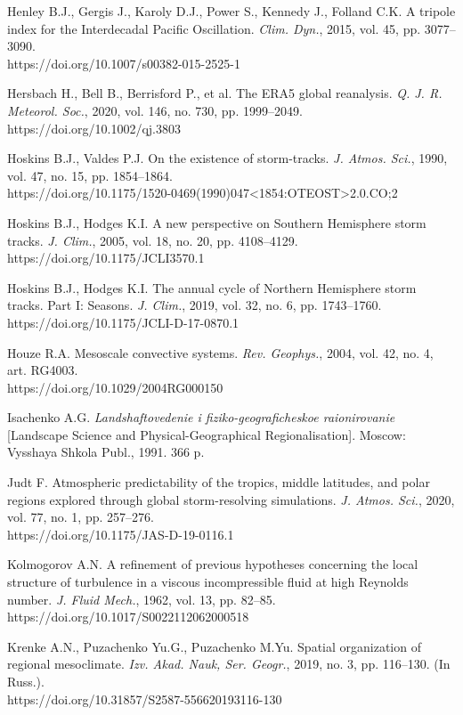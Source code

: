 \documentclass[12pt,a4paper]{article}
\begin{document}
\noindent Henley B.J., Gergis J., Karoly D.J., Power S., Kennedy J., Folland C.K. A tripole index for the Interdecadal Pacific Oscillation. \textit{Clim. Dyn.}, 2015, vol. 45, pp. 3077–3090.\\ https://doi.org/10.1007/s00382-015-2525-1

\noindent Hersbach H., Bell B., Berrisford P., et al. The ERA5 global reanalysis. \textit{Q. J. R. Meteorol. Soc.}, 2020, vol. 146, no. 730, pp. 1999–2049.\\ https://doi.org/10.1002/qj.3803

\noindent Hoskins B.J., Valdes P.J. On the existence of storm-tracks. \textit{J. Atmos. Sci.}, 1990, vol. 47, no. 15, pp. 1854–1864.\\ https://doi.org/10.1175/1520-0469(1990)047<1854:OTEOST>2.0.CO;2

\noindent Hoskins B.J., Hodges K.I. A new perspective on Southern Hemisphere storm tracks. \textit{J. Clim.}, 2005, vol. 18, no. 20, pp. 4108–4129.\\ https://doi.org/10.1175/JCLI3570.1

\noindent Hoskins B.J., Hodges K.I. The annual cycle of Northern Hemisphere storm tracks. Part I: Seasons. \textit{J. Clim.}, 2019, vol. 32, no. 6, pp. 1743–1760.\\ https://doi.org/10.1175/JCLI-D-17-0870.1

\noindent Houze R.A. Mesoscale convective systems. \textit{Rev. Geophys.}, 2004, vol. 42, no. 4, art. RG4003.\\ https://doi.org/10.1029/2004RG000150

\noindent Isachenko A.G. \textit{Landshaftovedenie i fiziko-geograficheskoe raionirovanie} [Landscape Science and Physical-Geographical Regionalisation]. Moscow: Vysshaya Shkola Publ., 1991. 366 p.

\noindent Judt F. Atmospheric predictability of the tropics, middle latitudes, and polar regions explored through global storm-resolving simulations. \textit{J. Atmos. Sci.}, 2020, vol. 77, no. 1, pp. 257–276.\\ https://doi.org/10.1175/JAS-D-19-0116.1

\noindent Kolmogorov A.N. A refinement of previous hypotheses concerning the local structure of turbulence in a viscous incompressible fluid at high Reynolds number. \textit{J. Fluid Mech.}, 1962, vol. 13, pp. 82–85.\\ https://doi.org/10.1017/S0022112062000518

\noindent Krenke A.N., Puzachenko Yu.G., Puzachenko M.Yu. Spatial organization of regional mesoclimate. \textit{Izv. Akad. Nauk, Ser. Geogr.}, 2019, no. 3, pp. 116–130. (In Russ.).\\ https://doi.org/10.31857/S2587-556620193116-130
\end{document}
